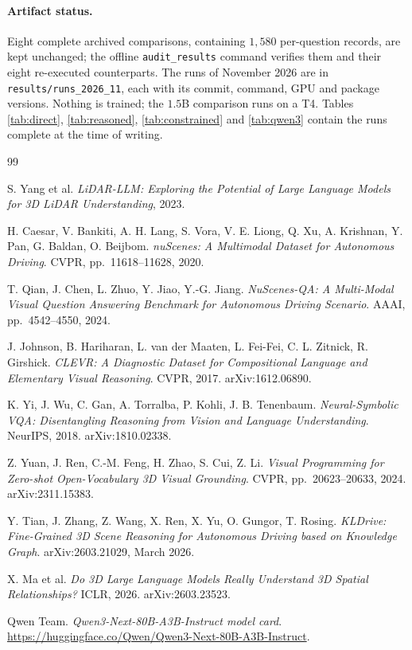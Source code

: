 \documentclass[11pt,a4paper]{article}
\newcommand{\code}[1]{\texttt{\small #1}}
\begin{document}
\paragraph{Artifact status.} Eight complete archived comparisons, containing
$1{,}580$ per-question records, are kept unchanged; the offline
\code{audit\_results} command verifies them and their eight re-executed
counterparts. The runs of November 2026 are in
\code{results/runs\_2026\_11}, each with its commit, command, GPU and package
versions. Nothing is trained; the $1.5$B comparison runs on a T4. Tables
\ref{tab:direct}, \ref{tab:reasoned}, \ref{tab:constrained} and
\ref{tab:qwen3} contain the runs complete at the time of writing.

\begin{thebibliography}{99}
\small
\setlength{\itemsep}{1pt}
\setlength{\parskip}{0pt}

 S. Yang et al.
  \emph{LiDAR-LLM: Exploring the Potential of Large Language Models for 3D
  LiDAR Understanding}, 2023.

 H. Caesar, V. Bankiti, A. H. Lang, S. Vora, V. E. Liong,
  Q. Xu, A. Krishnan, Y. Pan, G. Baldan, O. Beijbom.
  \emph{nuScenes: A Multimodal Dataset for Autonomous Driving}.
  CVPR, pp.\ 11618--11628, 2020.

 T. Qian, J. Chen, L. Zhuo, Y. Jiao, Y.-G. Jiang.
  \emph{NuScenes-QA: A Multi-Modal Visual Question Answering Benchmark for
  Autonomous Driving Scenario}. AAAI, pp.\ 4542--4550, 2024.

 J. Johnson, B. Hariharan, L. van der Maaten, L. Fei-Fei,
  C. L. Zitnick, R. Girshick. \emph{CLEVR: A Diagnostic Dataset for
  Compositional Language and Elementary Visual Reasoning}.
  CVPR, 2017. arXiv:1612.06890.

 K. Yi, J. Wu, C. Gan, A. Torralba, P. Kohli, J. B. Tenenbaum.
  \emph{Neural-Symbolic VQA: Disentangling Reasoning from Vision and Language
  Understanding}. NeurIPS, 2018. arXiv:1810.02338.

 Z. Yuan, J. Ren, C.-M. Feng, H. Zhao, S. Cui, Z. Li.
  \emph{Visual Programming for Zero-shot Open-Vocabulary 3D Visual Grounding}.
  CVPR, pp.\ 20623--20633, 2024. arXiv:2311.15383.

 Y. Tian, J. Zhang, Z. Wang, X. Ren, X. Yu, O. Gungor,
  T. Rosing. \emph{KLDrive: Fine-Grained 3D Scene Reasoning for Autonomous
  Driving based on Knowledge Graph}. arXiv:2603.21029, March 2026.

 X. Ma et al. \emph{Do 3D Large Language Models Really
  Understand 3D Spatial Relationships?} ICLR, 2026. arXiv:2603.23523.

 Qwen Team.
  \emph{Qwen3-Next-80B-A3B-Instruct model card}.
  \url{https://huggingface.co/Qwen/Qwen3-Next-80B-A3B-Instruct}.

\end{thebibliography}
\end{document}
